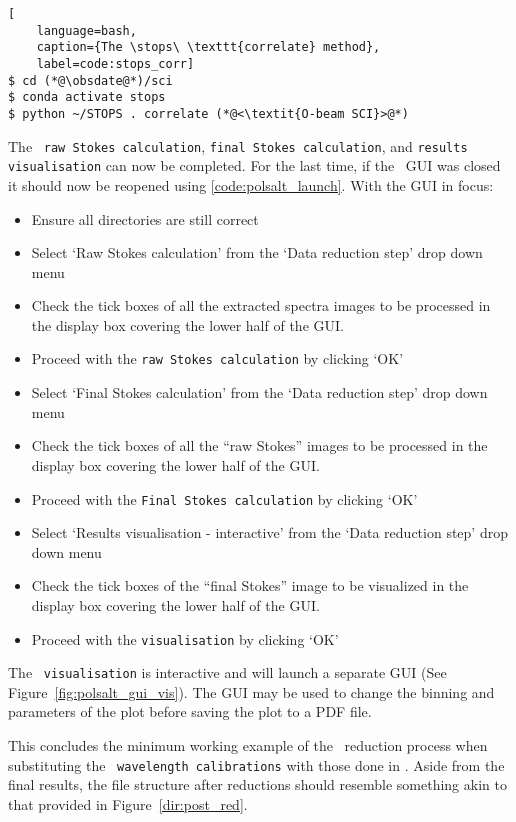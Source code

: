 \begin{lstlisting}[
    language=bash,
    caption={The \stops\ \texttt{correlate} method},
    label=code:stops_corr]
$ cd (*@\obsdate@*)/sci
$ conda activate stops
$ python ~/STOPS . correlate (*@<\textit{O-beam SCI}>@*)
\end{lstlisting}

The \polsalt\ \texttt{raw Stokes calculation}, \texttt{final Stokes calculation}, and \texttt{results visualisation} can now be completed. For the last time, if the \polsalt\ \gls{GUI} was closed it should now be reopened using \ref{code:polsalt_launch}. With the \gls{GUI} in focus:
\begin{itemize}
    \item Ensure all directories are still correct
    \item Select `Raw Stokes calculation' from the `Data reduction step' drop down menu
    \item Check the tick boxes of all the extracted spectra images to be processed in the display box covering the lower half of the \gls{GUI}.
    \item Proceed with the \texttt{raw Stokes calculation} by clicking `OK'
    \item Select `Final Stokes calculation' from the `Data reduction step' drop down menu
    \item Check the tick boxes of all the ``raw Stokes'' images to be processed in the display box covering the lower half of the \gls{GUI}.
    \item Proceed with the \texttt{Final Stokes calculation} by clicking `OK'
    \item Select `Results visualisation - interactive' from the `Data reduction step' drop down menu
    \item Check the tick boxes of the ``final Stokes'' image to be visualized in the display box covering the lower half of the \gls{GUI}.
    \item Proceed with the \texttt{visualisation} by clicking `OK'
\end{itemize}

The \polsalt\ \texttt{visualisation} is interactive and will launch a separate \gls{GUI} (See Figure~\ref{fig:polsalt_gui_vis}). The \gls{GUI} may be used to change the binning and parameters of the plot before saving the plot to a PDF file.

This concludes the minimum working example of the \polsalt\ reduction process when substituting the \polsalt\ \texttt{wavelength calibrations} with those done in \iraf. Aside from the final results, the file structure after reductions should resemble something akin to that provided in Figure~\ref{dir:post_red}.

